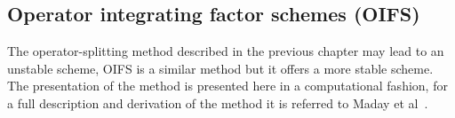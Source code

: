 



\subsection{Operator integrating factor schemes (OIFS)}
The operator-splitting method described in the previous chapter may lead to an unstable scheme,
OIFS is a similar method but it offers a more stable scheme. The presentation of the method 
is presented here in a computational fashion, for a full description and derivation of the method 
it is referred to Maday et al~\cite{raey}.

